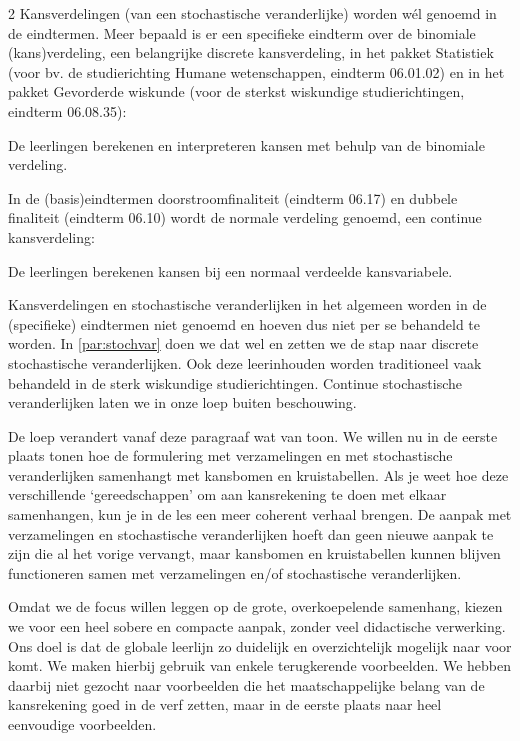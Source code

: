 \begin{multicols}{2}
Kansverdelingen (van een stochastische veranderlijke) worden wél genoemd in de eindtermen. Meer bepaald is er een specifieke eindterm over de binomiale (kans)verdeling, een belangrijke discrete kansverdeling, in het pakket Statistiek (voor bv. de studierichting Humane wetenschappen, eindterm 06.01.02) en in het pakket Gevorderde wiskunde (voor de sterkst wiskundige studierichtingen, eindterm 06.08.35):
\begin{citaat}
De leerlingen berekenen en interpreteren kansen met behulp van de binomiale verdeling.
\end{citaat}

In de (basis)eindtermen doorstroomfinaliteit (eindterm 06.17) en dubbele finaliteit (eindterm 06.10) wordt de normale verdeling genoemd, een continue kansverdeling:
\begin{citaat}
De leerlingen berekenen kansen bij een normaal verdeelde kansvariabele.
\end{citaat}

Kansverdelingen en stochastische veranderlijken in het algemeen worden in de (specifieke) eindtermen niet genoemd en hoeven dus niet per se behandeld te worden. In \autoref{par:stochvar} doen we dat wel en zetten we de stap naar discrete stochastische veranderlijken. Ook deze leerinhouden worden traditioneel vaak behandeld in de sterk wiskundige studierichtingen. Continue stochastische veranderlijken laten we in onze loep buiten beschouwing.

De loep verandert vanaf deze paragraaf wat van toon. We willen nu in de eerste plaats tonen hoe de formulering met verzamelingen en met stochastische veranderlijken samenhangt met kansbomen en kruistabellen. Als je weet hoe deze verschillende ‘gereedschappen’ om aan kansrekening te doen met elkaar samenhangen, kun je in de les een meer coherent verhaal brengen. De aanpak met verzamelingen en stochastische veranderlijken hoeft dan geen nieuwe aanpak te zijn die al het vorige vervangt, maar kansbomen en kruistabellen kunnen blijven functioneren samen met verzamelingen en/of stochastische veranderlijken.

Omdat we de focus willen leggen op de grote, overkoepelende samenhang, kiezen we voor een heel sobere en compacte aanpak, zonder veel didactische verwerking. Ons doel is dat de globale leerlijn zo duidelijk en overzichtelijk mogelijk naar voor komt. We maken hierbij gebruik van enkele terugkerende voorbeelden. We hebben daarbij niet gezocht naar voorbeelden die het maatschappelijke belang van de kansrekening goed in de verf zetten, maar in de eerste plaats naar heel eenvoudige voorbeelden. 


\end{multicols}
